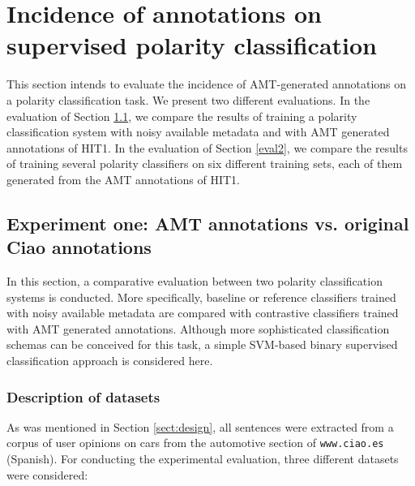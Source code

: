 \documentclass[11pt,letterpaper]{article}
\begin{document}
\section{Incidence of annotations on supervised polarity classification}
\label{sect:classifier}

This section intends to evaluate the incidence of AMT-generated annotations on a polarity classification task. We present two different evaluations. In the evaluation of Section \ref{eval1}, we compare the results of training a polarity classification system with noisy available metadata and with AMT generated annotations of HIT1. In the evaluation of Section \ref{eval2}, we compare the results of training several polarity classifiers on six different training sets, each of them generated from the AMT annotations of HIT1.

\subsection{Experiment one: AMT annotations vs. original Ciao annotations}
\label{eval1}

In this section, a comparative evaluation between two polarity classification systems is conducted. More specifically, baseline or reference classifiers trained with noisy available metadata are compared with contrastive classifiers trained with AMT generated annotations. Although more sophisticated classification schemas can be conceived for this task, a simple SVM-based binary supervised classification approach is considered here.

\subsubsection{Description of datasets}
\label{datasets}

As was mentioned in Section \ref{sect:design}, all sentences were extracted from a corpus of user opinions on cars from the automotive section of \texttt{www.ciao.es} (Spanish). For conducting the experimental evaluation, three different datasets were considered:
\end{document}
